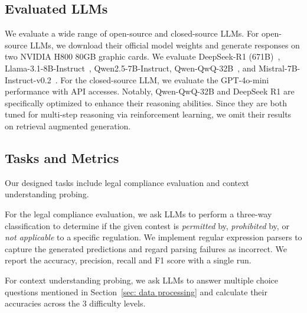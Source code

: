 \subsection{Evaluated LLMs}
We evaluate a wide range of open-source and closed-source LLMs.
For open-source LLMs, we download their official model weights and generate responses on two NVIDIA  H800 80GB graphic cards.
We evaluate DeepSeek-R1 (671B)~\cite{guo2025deepseek}, Llama-3.1-8B-Instruct~\cite{llama3modelcard}, Qwen2.5-7B-Instruct,  Qwen-QwQ-32B~\cite{Yang2024Qwen2TR}, and Mistral-7B-Instruct-v0.2~\cite{jiang2023mistral}.
For the closed-source LLM, we evaluate the GPT-4o-mini performance with API accesses.
Notably, Qwen-QwQ-32B and DeepSeek R1 are specifically optimized to enhance their reasoning abilities.
Since they are both tuned for multi-step reasoning via reinforcement learning, we omit their results on retrieval augmented generation.

\subsection{Tasks and Metrics}
Our designed tasks include legal compliance evaluation and context understanding probing.

For the legal compliance evaluation, we ask LLMs to perform a three-way classification to determine if the given contest is \textit{permitted} by, \textit{prohibited} by, or \textit{not applicable} to a specific regulation.
We implement regular expression parsers to capture the generated predictions and regard parsing failures as incorrect.
We report the accuracy, precision, recall and F1 score with a single run.

For context understanding probing, we ask LLMs to answer multiple choice questions mentioned in Section~\ref{sec: data processing} and calculate their accuracies across the 3 difficulty levels.